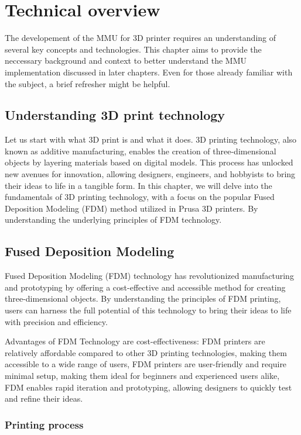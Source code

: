 \chapter{Technical overview}

The developement of the MMU for 3D printer requires an understanding of several key concepts and technologies. This chapter aims to provide the neccessary background and context to better understand the MMU implementation discussed in later chapters. Even for those already familiar with the subject, a brief refresher might be helpful.

\section{Understanding 3D print technology}

Let us start with what 3D print is and what it does.
3D printing technology, also known as additive manufacturing, enables the creation of three-dimensional objects by layering materials based on digital models. This process has unlocked new avenues for innovation, allowing designers, engineers, and hobbyists to bring their ideas to life in a tangible form. In this chapter, we will delve into the fundamentals of 3D printing technology, with a focus on the popular Fused Deposition Modeling (FDM) method utilized in Prusa 3D printers. By understanding the underlying principles of FDM technology.

\section{Fused Deposition Modeling}

Fused Deposition Modeling (FDM) \cite{fdm} technology has revolutionized manufacturing and prototyping by offering a cost-effective and accessible method for creating three-dimensional objects. By understanding the principles of FDM printing, users can harness the full potential of this technology to bring their ideas to life with precision and efficiency.

Advantages of FDM Technology are cost-effectiveness: FDM printers are relatively affordable compared to other 3D printing technologies, making them accessible to a wide range of users, FDM printers are user-friendly and require minimal setup, making them ideal for beginners and experienced users alike, FDM enables rapid iteration and prototyping, allowing designers to quickly test and refine their ideas.

\subsection{Printing process}

